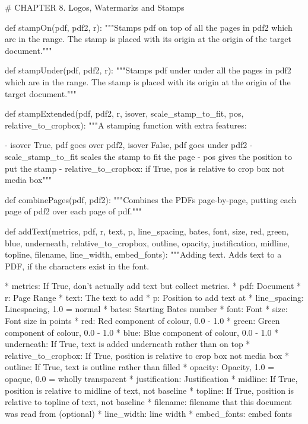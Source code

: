 # CHAPTER 8. Logos, Watermarks and Stamps

def stampOn(pdf, pdf2, r):
    """Stamps pdf on top of all the pages in pdf2 which are in the range. The
    stamp is placed with its origin at the origin of the target document."""

def stampUnder(pdf, pdf2, r):
    """Stamps pdf under under all the pages in pdf2 which are in the range. The
    stamp is placed with its origin at the origin of the target document."""

def stampExtended(pdf, pdf2, r, isover, scale_stamp_to_fit, pos,
                  relative_to_cropbox):
    """A stamping function with extra features:

     - isover True, pdf goes over pdf2, isover False, pdf goes under pdf2
     - scale_stamp_to_fit scales the stamp to fit the page
     - pos gives the position to put the stamp
     - relative_to_cropbox: if True, pos is relative to crop box not media box"""

def combinePages(pdf, pdf2):
    """Combines the PDFs page-by-page, putting each page of pdf2 over each page
    of pdf."""

def addText(metrics, pdf, r, text, p, line_spacing, bates, font, size, red,
            green, blue, underneath, relative_to_cropbox, outline, opacity,
            justification, midline, topline, filename, line_width,
            embed_fonts):
    """Adding text. Adds text to a PDF, if the characters exist in the font.

         * metrics: If True, don't actually add text but collect metrics.
         * pdf:	Document
         * r: Page Range
         * text: The text to add
         * p: Position to add text at
         * line_spacing: Linespacing, 1.0 = normal
         * bates: Starting Bates number
         * font: Font
         * size: Font size in points
         * red: Red component of colour, 0.0 - 1.0
         * green: Green component of colour, 0.0 - 1.0
         * blue: Blue component of colour, 0.0 - 1.0
         * underneath: If True, text is added underneath rather than on top
         * relative_to_cropbox: If True, position is relative to crop box not
           media box
         * outline: If True, text is outline rather than filled
         * opacity: Opacity, 1.0 = opaque, 0.0 = wholly transparent
         * justification: Justification
         * midline: If True, position is relative to midline of text, not
           baseline
         * topline: If True, position is relative to topline of text, not
           baseline
         * filename: filename that this document was read from (optional)
         * line_width: line width
         * embed_fonts: embed fonts

